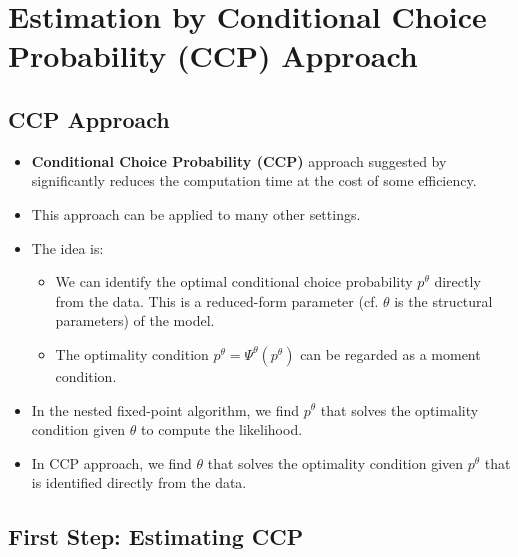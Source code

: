 \documentclass[]{book}
\providecommand{\tightlist}{%
  \setlength{\itemsep}{0pt}\setlength{\parskip}{0pt}}
\begin{document}
\section{Estimation by Conditional Choice Probability (CCP)
Approach}\label{estimation-by-conditional-choice-probability-ccp-approach}

\subsection{CCP Approach}\label{ccp-approach}

\begin{itemize}
\tightlist
\item
  \textbf{Conditional Choice Probability (CCP)} approach suggested by
  \citet{hotzConditionalChoiceProbabilities1993} significantly reduces
  the computation time at the cost of some efficiency.
\item
  This approach can be applied to many other settings.
\item
  The idea is:

  \begin{itemize}
  \tightlist
  \item
    We can identify the optimal conditional choice probability
    \(p^\theta\) directly from the data. This is a reduced-form
    parameter (cf. \(\theta\) is the structural parameters) of the
    model.
  \item
    The optimality condition \(p^\theta = \Psi^\theta(p^\theta)\) can be
    regarded as a moment condition.
  \end{itemize}
\item
  In the nested fixed-point algorithm, we find \(p^\theta\) that solves
  the optimality condition given \(\theta\) to compute the likelihood.
\item
  In CCP approach, we find \(\theta\) that solves the optimality
  condition given \(p^\theta\) that is identified directly from the
  data.
\end{itemize}

\subsection{First Step: Estimating CCP}\label{first-step-estimating-ccp}
\end{document}
